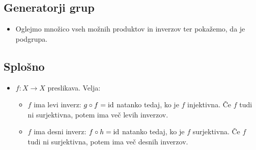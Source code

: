 \subsection{Generatorji grup}
\begin{itemize}
    \item Oglejmo množico vseh možnih produktov in inverzov ter pokažemo, da je podgrupa.
\end{itemize}

\subsection{Splošno}
\begin{itemize}
    \item \(f: X \to X\) preslikava. Velja:
    \begin{itemize}
        \item \(f\) ima levi inverz: \(g \circ f = \operatorname{id}\) natanko tedaj, ko je \(f\) injektivna. Če \(f\) tudi ni surjektivna, potem ima več levih inverzov.
        \item \(f\) ima desni inverz: \(f \circ h = \operatorname{id}\) natanko tedaj, ko je \(f\) surjektivna. Če \(f\) tudi ni surjektivna, potem ima več desnih inverzov.
    \end{itemize}
\end{itemize}